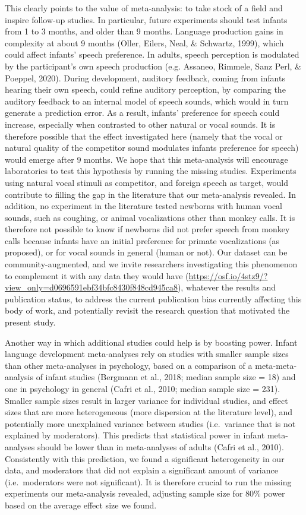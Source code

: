 \documentclass[
  man,mask,floatsintext]{apa6}
\begin{document}
This clearly points to the value of meta-analysis: to take stock of a field and inspire follow-up studies. In particular, future experiments should test infants from 1 to 3 months, and older than 9 months. Language production gains in complexity at about 9 months (Oller, Eilers, Neal, \& Schwartz, 1999), which could affect infants' speech preference. In adults, speech perception is modulated by the participant's own speech production (e.g. Assaneo, Rimmele, Sanz Perl, \& Poeppel, 2020). During development, auditory feedback, coming from infants hearing their own speech, could refine auditory perception, by comparing the auditory feedback to an internal model of speech sounds, which would in turn generate a prediction error. As a result, infants' preference for speech could increase, especially when contrasted to other natural or vocal sounds. It is therefore possible that the effect investigated here (namely that the vocal or natural quality of the competitor sound modulates infants preference for speech) would emerge after 9 months. We hope that this meta-analysis will encourage laboratories to test this hypothesis by running the missing studies. Experiments using natural vocal stimuli as competitor, and foreign speech as target, would contribute to filling the gap in the literature that our meta-analysis revealed. In addition, no experiment in the literature tested newborns with human vocal sounds, such as coughing, or animal vocalizations other than monkey calls. It is therefore not possible to know if newborns did not prefer speech from monkey calls because infants have an initial preference for primate vocalizations (as proposed), or for vocal sounds in general (human or not). Our dataset can be community-augmented, and we invite researchers investigating this phenomenon to complement it with any data they would have (\url{https://osf.io/4stz9/?view_only=d0696591ebf34bfc8430f848cd945ca8}), whatever the results and publication status, to address the current publication bias currently affecting this body of work, and potentially revisit the research question that motivated the present study.

Another way in which additional studies could help is by boosting power. Infant language development meta-analyses rely on studies with smaller sample sizes than other meta-analyses in psychology, based on a comparison of a meta-meta-analysis of infant studies (Bergmann et al., 2018; median sample size = 18) and one in psychology in general (Cafri et al., 2010; median sample size = 231). Smaller sample sizes result in larger variance for individual studies, and effect sizes that are more heterogeneous (more dispersion at the literature level), and potentially more unexplained variance between studies (i.e.~variance that is not explained by moderators). This predicts that statistical power in infant meta-analyses should be lower than in meta-analyses of adults (Cafri et al., 2010). Consistently with this prediction, we found a significant heterogeneity in our data, and moderators that did not explain a significant amount of variance (i.e.~moderators were not significant). It is therefore crucial to run the missing experiments our meta-analysis revealed, adjusting sample size for 80\% power based on the average effect size we found.
\end{document}
